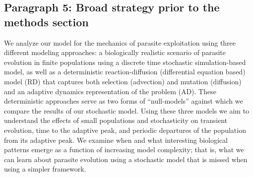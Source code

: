 \subsection*{Paragraph 5: Broad strategy prior to the methods section}

We analyze our model for the mechanics of parasite exploitation using three different modeling approaches: a biologically realistic scenario of parasite evolution in finite populations using a discrete time stochastic simulation-based model, as well as a deterministic reaction-diffusion (differential equation based) model (RD) that captures both selection (advection) and mutation (diffusion) and an adaptive dynamics representation of the problem (AD). These deterministic approaches serve as two forms of ``null-models'' against which we compare the results of our stochastic model. Using these three models we aim to understand the effects of small populations and stochasticity on transient evolution, time to the adaptive peak, and periodic departures of the population from its adaptive peak. We examine when and what interesting biological patterns emerge as a function of increasing model complexity; that is, what we can learn about parasite evolution using a stochastic model that is missed when using a simpler framework.
